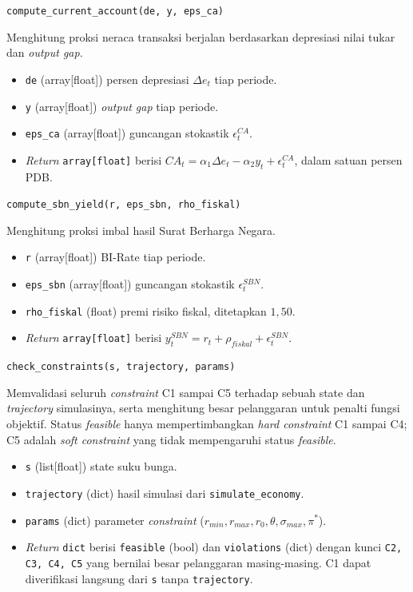 \texttt{compute\_current\_account(de, y, eps\_ca)}

Menghitung proksi neraca transaksi berjalan berdasarkan depresiasi nilai tukar dan \textit{output gap}.

\begin{itemize}
    \item \texttt{de} (array[float]) persen depresiasi $\Delta e_t$ tiap periode.
    \item \texttt{y} (array[float]) \textit{output gap} tiap periode.
    \item \texttt{eps\_ca} (array[float]) guncangan stokastik $\epsilon_t^{CA}$.
    \item \textit{Return} \texttt{array[float]} berisi $CA_t = \alpha_1 \Delta e_t - \alpha_2 y_t + \epsilon_t^{CA}$, dalam satuan persen PDB.
\end{itemize}

\texttt{compute\_sbn\_yield(r, eps\_sbn, rho\_fiskal)}

Menghitung proksi imbal hasil Surat Berharga Negara.

\begin{itemize}
    \item \texttt{r} (array[float]) BI-Rate tiap periode.
    \item \texttt{eps\_sbn} (array[float]) guncangan stokastik $\epsilon_t^{SBN}$.
    \item \texttt{rho\_fiskal} (float) premi risiko fiskal, ditetapkan $1{,}50$.
    \item \textit{Return} \texttt{array[float]} berisi $y_t^{SBN} = r_t + \rho_{fiskal} + \epsilon_t^{SBN}$.
\end{itemize}

\texttt{check\_constraints(s, trajectory, params)}

Memvalidasi seluruh \textit{constraint} C1 sampai C5 terhadap sebuah state dan \textit{trajectory} simulasinya, serta menghitung besar pelanggaran untuk penalti fungsi objektif. Status \textit{feasible} hanya mempertimbangkan \textit{hard constraint} C1 sampai C4; C5 adalah \textit{soft constraint} yang tidak mempengaruhi status \textit{feasible}.

\begin{itemize}
    \item \texttt{s} (list[float]) state suku bunga.
    \item \texttt{trajectory} (dict) hasil simulasi dari \texttt{simulate\_economy}.
    \item \texttt{params} (dict) parameter \textit{constraint} ($r_{min}, r_{max}, r_0, \theta, \sigma_{max}, \pi^{*}$).
    \item \textit{Return} \texttt{dict} berisi \texttt{feasible} (bool) dan \texttt{violations} (dict) dengan kunci \texttt{C2, C3, C4, C5} yang bernilai besar pelanggaran masing-masing. C1 dapat diverifikasi langsung dari \texttt{s} tanpa \texttt{trajectory}.
\end{itemize}


